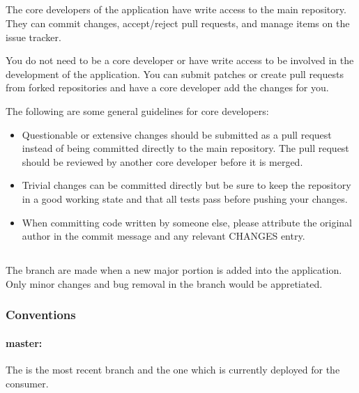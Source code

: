 \documentclass[letterpaper,10pt,english]{sphinxmanual}
\begin{document}
\subsection{}
\label{\detokenize{developer:core-developers}}
The core developers of the application have write access to the main repository. They can commit changes, accept/reject pull requests, and manage items on the issue tracker.

You do not need to be a core developer or have write access to be involved in the development of the application. You can submit patches or create pull requests from forked repositories and have a core developer add the changes for you.

The following are some general guidelines for core developers:
\begin{itemize}
\item {} 
Questionable or extensive changes should be submitted as a pull request instead of being committed directly to the main repository. The pull request should be reviewed by another core developer before it is merged.

\item {} 
Trivial changes can be committed directly but be sure to keep the repository in a good working state and that all tests pass before pushing your changes.

\item {} 
When committing code written by someone else, please attribute the original author in the commit message and any relevant CHANGES entry.

\end{itemize}


\subsection{}
\label{\detokenize{developer:branch-model}}
The branch are made when a new major portion is added into the application. Only minor changes and bug removal in the branch would be appretiated.


\subsubsection{Conventions}
\label{\detokenize{developer:conventions}}

\paragraph{master:}
\label{\detokenize{developer:master}}
The is the most recent branch and the one which is currently deployed for the consumer.
\end{document}
